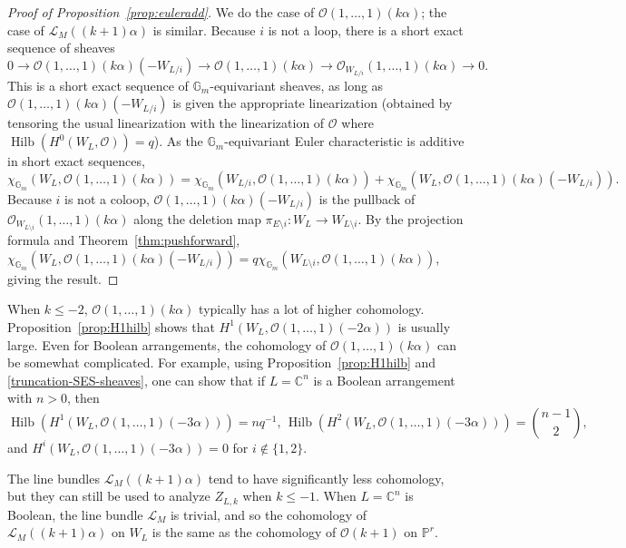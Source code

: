 \documentclass{amsart}
\theoremstyle{definition}
\begin{document}
\begin{proof}[Proof of Proposition~\ref{prop:euleradd}]
We do the case of $\mathcal{O}(1, \dotsc, 1)(k\alpha)$; the case of $\mathcal{L}_M((k+1)\alpha)$ is similar. Because $i$ is not a loop, there is a short exact sequence of sheaves
$$0 \to \mathcal{O}(1, \dotsc, 1)(k\alpha)(-W_{L/i}) \to \mathcal{O}(1, \dotsc, 1)(k\alpha) \to \mathcal{O}_{W_{L/i}}(1, \dotsc, 1)(k \alpha) \to 0.$$
This is a short exact sequence of $\mathbb{G}_m$-equivariant sheaves, as long as $\mathcal{O}(1, \dotsc, 1)(k\alpha)(-W_{L/i})$ is given the appropriate linearization (obtained by tensoring the usual linearization with the linearization of $\mathcal{O}$ where $\operatorname{Hilb}(H^0(W_L, \mathcal{O})) = q$). 
As the $\mathbb{G}_m$-equivariant Euler characteristic is additive in short exact sequences,
$$\chi_{\mathbb{G}_m}(W_L, \mathcal{O}(1, \dotsc, 1)(k\alpha)) = \chi_{\mathbb{G}_m}(W_{L/i}, \mathcal{O}(1, \dotsc, 1)(k\alpha)) + \chi_{\mathbb{G}_m}(W_{L}, \mathcal{O}(1, \dotsc, 1)(k\alpha)(-W_{L/i})).$$
Because $i$ is not a coloop, $\mathcal{O}(1, \dotsc, 1)(k\alpha)(-W_{L/i})$ is the pullback of $\mathcal{O}_{W_{L \setminus i}}(1, \dotsc, 1)(k\alpha)$ along the deletion map $\pi_{E \setminus i} \colon W_L \to W_{L \setminus i}$. By the projection formula and Theorem~\ref{thm:pushforward}, $\chi_{\mathbb{G}_m}(W_L, \mathcal{O}(1, \dotsc, 1)(k\alpha)(-W_{L/i})) = q \chi_{\mathbb{G}_m}(W_{L \setminus i}, \mathcal{O}(1, \dotsc, 1)(k\alpha))$, giving the result. 
\end{proof}

When $k \le -2$, $\mathcal{O}(1, \dotsc, 1)(k\alpha)$ typically has a lot of higher cohomology.  Proposition~\ref{prop:H1hilb} shows that $H^1(W_L, \mathcal{O}(1, \dotsc, 1)(-2\alpha))$ is usually large. Even for Boolean arrangements, the cohomology of $\mathcal{O}(1, \dotsc, 1)(k\alpha)$ can be somewhat complicated. For example, using Proposition~\ref{prop:H1hilb} and \eqref{truncation-SES-sheaves}, one can show that if $L = \mathbb{C}^n$ is a Boolean arrangement with $n > 0$, then
$$\operatorname{Hilb}(H^1(W_L, \mathcal{O}(1, \dotsc, 1)(-3 \alpha))) = n q^{-1}, \, \operatorname{Hilb}(H^2(W_L, \mathcal{O}(1, \dotsc, 1)(-3 \alpha))) = \binom{n-1}{2},$$
and $H^i(W_L, \mathcal{O}(1, \dotsc, 1)(-3 \alpha)) = 0$ for $i \not \in \{1, 2\}$. 

The line bundles $\mathcal{L}_M((k+1)\alpha)$ tend to have significantly less cohomology, but they can still be used to analyze $Z_{L, k}$ when $k \le -1$. When $L = \mathbb{C}^n$ is Boolean, the line bundle $\mathcal{L}_M$ is trivial, and so the cohomology of $\mathcal{L}_M((k+1)\alpha)$ on $W_L$ is the same as the cohomology of $\mathcal{O}(k+1)$ on $\mathbb{P}^{r}$. 
\end{document}
